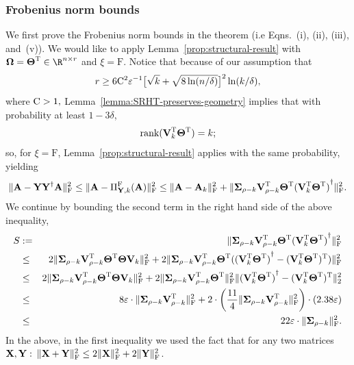 \subsubsection{Frobenius norm bounds}

We first prove the Frobenius norm bounds in the theorem (i.e Eqns.~(i), (ii), (iii), and~(v)). We would like to apply Lemma~\ref{prop:structural-result} with $\matOmega = \matTh\transp \in \R^{n \times r}$ and $\xi=\mathrm{F}$. Notice that because of our assumption that
$$r \geq 6 \mathrm{C}^2 \varepsilon^{-1} \big[\sqrt{k} + \sqrt{8 \ln(n/\delta)}\big]^2 \ln(k/\delta),$$
where $\mathrm{C} > 1,$ Lemma~\ref{lemma:SRHT-preserves-geometry} implies that with probability at least $1-3\delta$,
$$\hbox{\rm rank}({\bm{\mathrm{V}}}_k^{\textsc{T}} {\bm{\mathrm{\Theta}}}^{\textsc{T}}) = k;$$
so, for $\xi=\mathrm{F}$, Lemma~\ref{prop:structural-result} applies with the same probability, yielding
\begin{equation}
\label{eqn:frobenius-application-of-structural-result}
\FNormS{\matA - \matY \pinv{\matY} \matA } \le  \FNormS{\matA - \Pi_{\matY,k}^{\mathrm{F}}(\matA) } \le
\FNormS{\matA - \matA_k } + \FNormS{\matSig_{\rho-k} \matV_{\rho-k}\transp  \matTh\transp \pinv{(\matV_k\transp \matTh\transp)}}.
\end{equation}
We continue by bounding the second term in the right hand side of the above inequality,
%
\begin{eqnarray*}
 S &:=& \mbox{}\|{\bm{\mathrm{\Sigma}}}_{\rho-k} {\bm{\mathrm{V}}}_{\rho-k}^{\textsc{T}}  {\bm{\mathrm{\Theta}}}^{\textsc{T}} {({\bm{\mathrm{V}}}_k^{\textsc{T}} {\bm{\mathrm{\Theta}}}^{\textsc{T}})}^\dagger\|_\mathrm{F}^2 \\
&\leq&  2\mbox{}\|{\bm{\mathrm{\Sigma}}}_{\rho-k} {\bm{\mathrm{V}}}_{\rho-k}^{\textsc{T}}   {\bm{\mathrm{\Theta}}}^{\textsc{T}} {\bm{\mathrm{\Theta}}} {\bm{\mathrm{V}}}_k\|_\mathrm{F}^2 +
2\mbox{}\|{\bm{\mathrm{\Sigma}}}_{\rho-k} {\bm{\mathrm{V}}}_{\rho-k}^{\textsc{T}}   {\bm{\mathrm{\Theta}}}^{\textsc{T}}  ( {({\bm{\mathrm{V}}}_k^{\textsc{T}} {\bm{\mathrm{\Theta}}}^{\textsc{T}})}^\dagger - ({\bm{\mathrm{V}}}_k^{\textsc{T}} {\bm{\mathrm{\Theta}}}^{\textsc{T}})^{\textsc{T}} )\|_\mathrm{F}^2 \\
&\leq& 2\mbox{}\|{\bm{\mathrm{\Sigma}}}_{\rho-k} {\bm{\mathrm{V}}}_{\rho-k}^{\textsc{T}}   {\bm{\mathrm{\Theta}}}^{\textsc{T}} {\bm{\mathrm{\Theta}}} {\bm{\mathrm{V}}}_k\|_\mathrm{F}^2 +
2\mbox{}\|{\bm{\mathrm{\Sigma}}}_{\rho-k} {\bm{\mathrm{V}}}_{\rho-k}^{\textsc{T}}   {\bm{\mathrm{\Theta}}}^{\textsc{T}}\|_\mathrm{F}^2 \mbox{}\| {({\bm{\mathrm{V}}}_k^{\textsc{T}} {\bm{\mathrm{\Theta}}}^{\textsc{T}})}^\dagger - ({\bm{\mathrm{V}}}_k^{\textsc{T}} {\bm{\mathrm{\Theta}}}^{\textsc{T}})^{\textsc{T}}\|_2^2 \\
&\leq&
 8 \varepsilon \cdot \mbox{}\|{\bm{\mathrm{\Sigma}}}_{\rho-k} {\bm{\mathrm{V}}}_{\rho-k}^{\textsc{T}}  \|_\mathrm{F}^2  +
2\cdot  \left( {11\over 4} \mbox{}\|{\bm{\mathrm{\Sigma}}}_{\rho-k} {\bm{\mathrm{V}}}_{\rho-k}^{\textsc{T}}  \|_\mathrm{F}^2 \right) \cdot \left( 2.38 \varepsilon \right) \\
&\leq&  22 \varepsilon \cdot \mbox{}\|{\bm{\mathrm{\Sigma}}}_{\rho-k}\|_\mathrm{F}^2.
\end{eqnarray*}
%
In the above, in the first inequality we used the fact that for any two matrices ${\bm{\mathrm{X}}}, {\bm{\mathrm{Y}}}:$ $\mbox{}\|{\bm{\mathrm{X}}}+{\bm{\mathrm{Y}}}\|_\mathrm{F}^2 \le 2 \mbox{}\|{\bm{\mathrm{X}}}\|_\mathrm{F}^2 + 2 \mbox{}\|{\bm{\mathrm{Y}}}\|_\mathrm{F}^2$.
